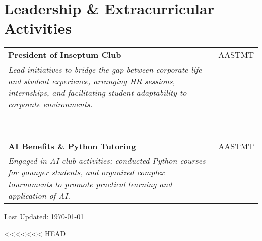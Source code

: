 \documentclass[letterpaper,11pt]{article}
\makeatletter
\newcommand{\resumeSubheading}[4]{\vspace{-2pt}\item
    \begin{tabular*}{0.97\textwidth}[t]{l@{\extracolsep{\fill}}r}
      \textbf{#1} & #2 \\
      \textit{\small#3} & \textit{\small #4} \\
    \end{tabular*}\vspace{-7pt}
}
\makeatother
\begin{document}
{%
\section{Leadership \& Extracurricular Activities}
\resumeSubHeadingListStart
    \resumeSubheading
      {President of Inseptum Club}{AASTMT}
      {Lead initiatives to bridge the gap between corporate life and student experience, arranging HR sessions, internships, and facilitating student adaptability to corporate environments.}{}{}\\
    \resumeSubheading
      {AI Benefits \& Python Tutoring}{AASTMT}
      {Engaged in AI club activities; conducted Python courses for younger students, and organized complex tournaments to promote practical learning and application of AI.}{}{}
\resumeSubHeadingListEnd





\begin{center}
    \small Last Updated: \today
\end{center}

<<<<<<< HEAD

    
    




    
    




}
\end{document}
